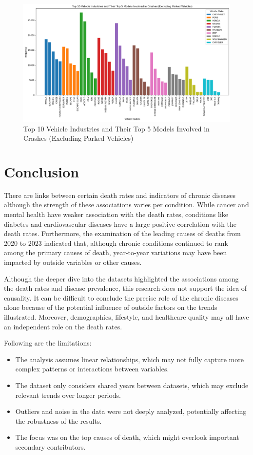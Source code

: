 \documentclass[a4paper,10pt]{article}
\begin{document}
\begin{figure}
    \centering
    \includegraphics[width=0.75\linewidth]{images/vehicle-industries-in-crashes.png}
    \caption{Top 10 Vehicle Industries and Their Top 5 Models Involved in Crashes (Excluding Parked Vehicles)}
    \label{fig:3.5}
\end{figure}

\section{Conclusion}

There are links between certain death rates and indicators of chronic diseases although the strength of these associations varies per condition. While cancer and mental health have weaker association with the death rates, conditions like diabetes and cardiovascular diseases have a large positive correlation with the death rates. Furthermore, the examination of the leading causes of deaths from 2020 to 2023 indicated that, although chronic conditions continued to rank among the primary causes of death, year-to-year variations may have been impacted by outside variables or other causes.

\vspace{1em}

Although the deeper dive into the datasets highlighted the associations among the death rates and disease prevalence, this research does not support the idea of causality. It can be difficult to conclude the precise role of the chronic diseases alone because of the potential influence of outside factors on the trends illustrated. Moreover, demographics, lifestyle, and healthcare quality may all have an independent role on the death rates.

\vspace{1em}

Following are the limitations:
\begin{itemize}
	\item The analysis assumes linear relationships, which may not fully capture more complex patterns or interactions between variables.
	\item The dataset only considers shared years between datasets, which may exclude relevant trends over longer periods.
	\item Outliers and noise in the data were not deeply analyzed, potentially affecting the robustness of the results.
	\item The focus was on the top causes of death, which might overlook important secondary contributors.
\end{itemize}
\end{document}
